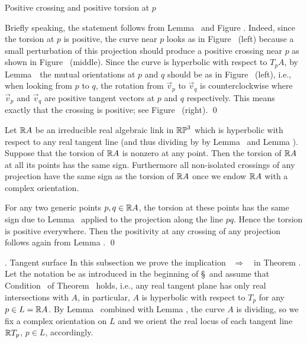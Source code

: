 \midinsert
\centerline{ \epsfxsize=100mm}
 Positive crossing and positive torsion at $p$
\endcaption
\endinsert

Briefly speaking, the statement follows from Lemma \lemHypTypeI\ and Figure \figHypPos.
Indeed, since the torsion at $p$ is positive,
the curve near $p$ looks as in Figure \figHypPos~(left)
because a small perturbation of this projection should produce a positive crossing near $p$
as shown in Figure \figHypPos~(middle).
Since the curve is hyperbolic with respect to $T_p A$,
by Lemma~\lemHypTypeI\ the mutual orientations at $p$ and $q$ should be as in Figure \figHypPos~(left),
i.e., when looking from $p$ to $q$, the rotation from $\vec v_p$ to $\vec v_q$ is counterclockwise
where $\vec v_p$ and $\vec v_q$ are positive tangent vectors at $p$ and $q$ respectively.
This means exactly that the crossing is positive; see Figure \figHypPos~(right).
\qed\enddemo

Let $\Bbb R A$ be an irreducible real algebraic link in $\Bbb{RP}^3$ which is
hyperbolic with respect to any real tangent line (and thus dividing by
by Lemma \lemHypTypeI\ and Lemma \lemHypKC).
Suppose that the torsion of $\Bbb R A$ is nonzero at any point.
Then the torsion of $\Bbb R A$ at all its points has the same sign.
Furthermore all non-isolated crossings of any
projection have the same sign as the torsion of $\Bbb R A$ once we endow
$\Bbb R A$ with a complex orientation.

\endproclaim

 For any two generic points $p,q\in\Bbb R A$, the torsion at these points has the same sign
due to Lemma \lemHypPosA\ applied to the projection along the line $pq$.
Hence the torsion is positive everywhere. Then the positivity at any crossing of any projection
follows again from Lemma \lemHypPosA.
\qed\enddemo



\subhead \sectT. Tangent surface
\endsubhead
%
In this subsection we prove the implication \CondH~$\Rightarrow$~\CondTA\ in  Theorem \thAnyGenus.
Let the notation be as introduced in the beginning of \S\sectHyperbSpa\
and assume that Condition \CondH\ of Theorem \thAnyGenus\
holds, i.e., any real tangent plane has only real intersections with $A$, in particular,
$A$ is hyperbolic with respect to $T_p$ for any $p\in L=\Bbb R A$.
By Lemma \lemHypTypeI\ combined with Lemma \lemHypKC, the curve $A$ is dividing, so we
fix a complex orientation on $L$ and we orient the real locus of each tangent line $\Bbb R T_p$, $p\in L$,
accordingly.

